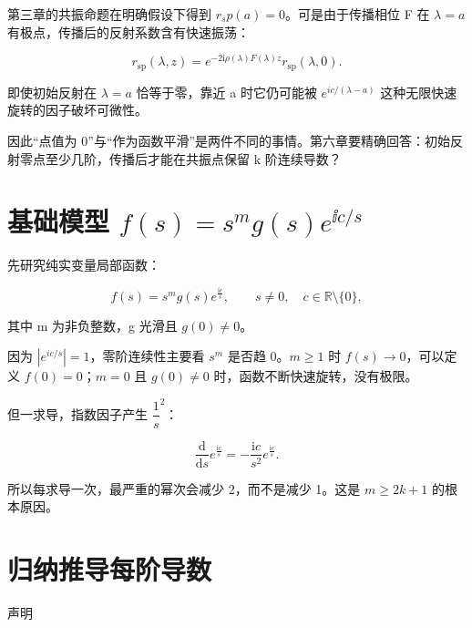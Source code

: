 第三章的共振命题在明确假设下得到 $r_sp(a)=0$。可是由于传播相位 F 在 $\lambda{}=a$ 有极点，传播后的反射系数含有快速振荡：\par

\[
r_{\mathrm{sp}}(\lambda,z)
=e^{-2\mathrm{i}\rho(\lambda)F(\lambda)z}
r_{\mathrm{sp}}(\lambda,0).
\]

即使初始反射在 $\lambda{}=a$ 恰等于零，靠近 a 时它仍可能被 $e^{ic/(\lambda-a)}$ 这种无限快速旋转的因子破坏可微性。\par

因此“点值为 0”与“作为函数平滑”是两件不同的事情。第六章要精确回答：初始反射零点至少几阶，传播后才能在共振点保留 k 阶连续导数？\par

\section{基础模型 \texorpdfstring{$f(s)=s^m g(s)e^{\ii c/s}$}{f(s) = s**m g(s) exp(ic/s)}}
\par

先研究纯实变量局部函数：\par

\[
f(s)=s^m g(s)e^{\frac{\mathrm{i}c}{s}},
\qquad s\ne0,\quad c\in\mathbb R\setminus\{0\},
\]

其中 m 为非负整数，g 光滑且 $g(0)\ne{}0$。\par

因为 $|e^{ic/s}|=1$，零阶连续性主要看 $s^m$ 是否趋 0。$m\ge{}1$ 时 $f(s)\to{}0$，可以定义 $f(0)=0$；$m=0$ 且 $g(0)\ne{}0$ 时，函数不断快速旋转，没有极限。\par

但一求导，指数因子产生 $\dfrac{1}{s}^{2}$：\par

\[
\dfrac{\mathrm{d}}{\mathrm{d}s}e^{\frac{\mathrm{i}c}{s}}
=-\dfrac{\mathrm{i}c}{s^2}e^{\frac{\mathrm{i}c}{s}}.
\]

所以每求导一次，最严重的幂次会减少 2，而不是减少 1。这是 $m\ge{}2k+1$ 的根本原因。\par

\section{归纳推导每阶导数}
\par

声明\par

